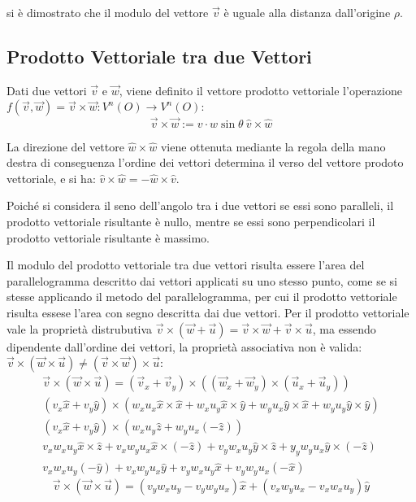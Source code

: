 \documentclass{article}
\numberwithin{equation}{subsection}
\begin{document}
si è dimostrato che il modulo del vettore $\vec{v}$ è uguale alla distanza dall'origine $\rho$.

\subsection{Prodotto Vettoriale tra due Vettori}
Dati due vettori $\vec{v}$ e $\vec{w}$, viene definito il vettore prodotto vettoriale l'operazione $f(\vec{v},\vec{w})=\vec{v}\times\vec{w}:V^n(O)\to V^n(O)$: 
\begin{equation}
    \vec{v}\times\vec{w} := v\cdot w\sin\theta\:\hat{v}\times\hat{w}
\end{equation}
    
La direzione del vettore $\hat{w}\times\hat{w}$ viene ottenuta mediante la regola della mano destra
di conseguenza l'ordine dei vettori determina il verso del vettore prodoto vettoriale, e si ha: $\hat{v}\times\hat{w} = -\hat{w}\times\hat{v}$.



Poiché si considera il seno dell'angolo tra i due vettori se essi sono paralleli, il prodotto vettoriale risultante è nullo, mentre se essi 
sono perpendicolari il prodotto vettoriale risultante è massimo. 


Il modulo del prodotto vettoriale tra due vettori risulta essere l'area del 
parallelogramma descritto dai vettori applicati su uno stesso punto, come se si stesse applicando il metodo del parallelogramma, per cui 
il prodotto vettoriale risulta essese l'area con segno descritta dai due vettori. 
Per il prodotto vettoriale vale la proprietà distrubutiva 
$\vec{v}\times(\vec{w} +\vec{u}) = \vec{v}\times\vec{w} + \vec{v}\times\vec{u}$, 
ma essendo 
dipendente dall'ordine dei vettori, la proprietà associativa 
non è valida: 
$\vec{v}\times(\vec{w}\times\vec{u}) \neq (\vec{v}\times\vec{w})\times\vec{u}$:
\begin{gather*}
    \vec{v}\times(\vec{w}\times\vec{u})=(\vec{v}_x+\vec{v}_y)\times((\vec{w}_x+\vec{w}_y)\times(\vec{u}_x+\vec{u}_y))\\
    (v_x\hat{x}+v_y\hat{y})\times(w_xu_x\hat{x}\times\hat{x}+w_xu_y\hat{x}\times\hat{y}+w_yu_x\hat{y}\times\hat{x}+w_yu_y\hat{y}\times\hat{y})\\
    (v_x\hat{x}+v_y\hat{y})\times(w_xu_y\hat{z}+w_yu_x(-\hat{z}))\\
    v_xw_xu_y\hat{x}\times\hat{z}+v_xw_yu_x\hat{x}\times(-\hat{z})+v_yw_xu_y\hat{y}\times\hat{z}+y_yw_yu_x\hat{y}\times(-\hat{z})\\
    v_xw_xu_y(-\hat{y})+v_xw_yu_x\hat{y}+v_yw_xu_y\hat{x}+v_yw_yu_x(-\hat{x})
\end{gather*}
\begin{equation}
    \vec{v}\times(\vec{w}\times\vec{u})=(v_yw_xu_y-v_yw_yu_x)\hat{x}+(v_xw_yu_x-v_xw_xu_y)\hat{y}
\end{equation}
\end{document}

